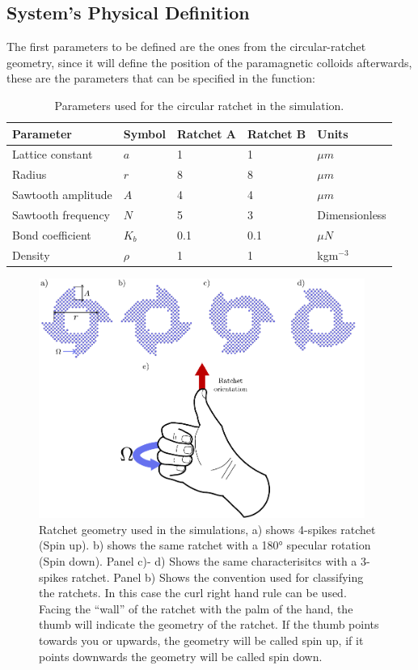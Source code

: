 \subsection{System's Physical Definition}

The first parameters to be defined are the ones from the circular-ratchet geometry, since it will define the position of the paramagnetic colloids afterwards, these are the parameters that can be specified in the function:

\begin{table}[H]
\centering
\caption[Ratchet physical parameters.]{Parameters used for the circular ratchet in the simulation.}
\begin{tabular}{l l l l l}
\hline
Parameter & Symbol & Ratchet A & Ratchet B & Units \\
\hline
Lattice constant & \(a\) & 1 & 1 & \(\mu m\) \\
Radius & \( r\) & 8 & 8 & \( \mu m\) \\
Sawtooth amplitude & \( A\) & 4 & 4 & \( \mu m\) \\
Sawtooth frequency & \( N\) & 5 & 3 & Dimensionless\\
Bond coefficient & \( K_b\) & 0.1 & 0.1 & \( \mu N\) \\ 
Density & \(\rho\) & 1 & 1 & kgm\(^{-3}\) \\
\hline
\end{tabular}
\end{table}

\begin{figure}
  \begin{center}
    \includegraphics[width=0.95\textwidth]{figures/ratchet.pdf}
  \end{center}
  \caption[Ratchet geomety.]{Ratchet geometry used in the simulations, a) shows 4-spikes ratchet (Spin up). b) shows the same ratchet with a 180° specular rotation (Spin down). Panel c)- d) Shows the same characterisitcs with a 3-spikes ratchet.  Panel b) Shows the convention used for classifying the ratchets. In this case the curl right hand rule can be used. Facing the ``wall'' of the ratchet with the palm of the hand, the thumb will indicate the geometry of the ratchet. If the thumb points towards you or upwards, the geometry will be called spin up, if it points downwards the geometry will be called spin down.}\label{fig:ratchetgeometry}
\end{figure}


